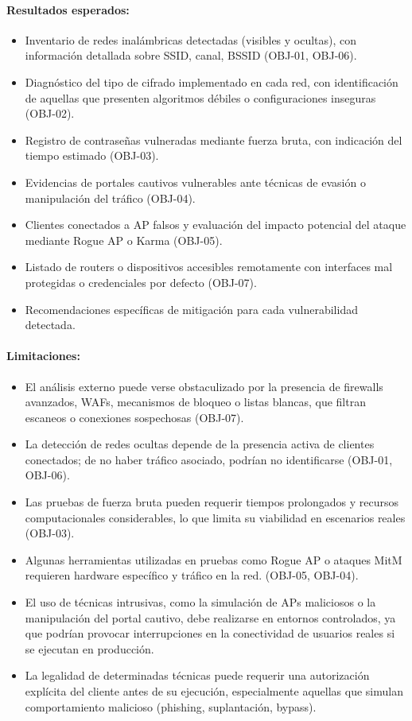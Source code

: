 \documentclass[a4paper, 10pt]{article}
\begin{document}
\paragraph{Resultados esperados:}
\begin{itemize}
    \item Inventario de redes inalámbricas detectadas (visibles y ocultas), con información detallada sobre SSID, canal, BSSID (OBJ-01, OBJ-06).
    \item Diagnóstico del tipo de cifrado implementado en cada red, con identificación de aquellas que presenten algoritmos débiles o configuraciones inseguras (OBJ-02).
    \item Registro de contraseñas vulneradas mediante fuerza bruta, con indicación del tiempo estimado (OBJ-03).
    \item Evidencias de portales cautivos vulnerables ante técnicas de evasión o manipulación del tráfico (OBJ-04).
    \item Clientes conectados a AP falsos y evaluación del impacto potencial del ataque mediante Rogue AP o Karma (OBJ-05).
    \item Listado de routers o dispositivos accesibles remotamente con interfaces mal protegidas o credenciales por defecto (OBJ-07).
    \item Recomendaciones específicas de mitigación para cada vulnerabilidad detectada.
\end{itemize}

\paragraph{Limitaciones:}
\begin{itemize}
    \item El análisis externo puede verse obstaculizado por la presencia de firewalls avanzados, WAFs, mecanismos de bloqueo o listas blancas, que filtran escaneos o conexiones sospechosas (OBJ-07).
    \item La detección de redes ocultas depende de la presencia activa de clientes conectados; de no haber tráfico asociado, podrían no identificarse (OBJ-01, OBJ-06).
    \item Las pruebas de fuerza bruta pueden requerir tiempos prolongados y recursos computacionales considerables, lo que limita su viabilidad en escenarios reales (OBJ-03).
    \item Algunas herramientas utilizadas en pruebas como Rogue AP o ataques MitM requieren hardware específico y tráfico en la red. (OBJ-05, OBJ-04).
    \item El uso de técnicas intrusivas, como la simulación de APs maliciosos o la manipulación del portal cautivo, debe realizarse en entornos controlados, ya que podrían provocar interrupciones en la conectividad de usuarios reales si se ejecutan en producción.
    \item La legalidad de determinadas técnicas puede requerir una autorización explícita del cliente antes de su ejecución, especialmente aquellas que simulan comportamiento malicioso (phishing, suplantación, bypass).
\end{itemize}
\end{document}
